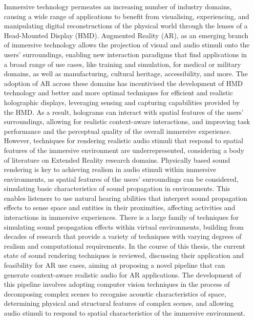 \beforeabstract{}
Immersive technology permeates an increasing number of industry domains, causing a wide range of applications to benefit from visualising, experiencing, and manipulating digital reconstructions of the physical world through the lenses of a Head-Mounted Display (HMD). Augmented Reality (AR), as an emerging branch of immersive technology allows the projection of visual and audio stimuli onto the users' surroundings, enabling new interaction paradigms that find applications in a broad range of use cases, like training and simulation, for medical or military domains, as well as manufacturing, cultural heritage, accessibility, and more.
The adoption of AR across these domains has incentivised the development of HMD technology and better and more optimal techniques for efficient and realistic holographic displays, leveraging sensing and capturing capabilities provided by the HMD. As a result, holograms can interact with spatial features of the users' surroundings, allowing for realistic context-aware interactions, and improving task performance and the perceptual quality of the overall immersive experience. However, techniques for rendering realistic audio stimuli that respond to spatial features of the immersive environment are underrepresented, considering a body of literature on Extended Reality research domains. 
Physically based sound rendering is key to achieving realism in audio stimuli within immersive environments, as spatial features of the users' surroundings can be considered, simulating basic characteristics of sound propagation in environments. This enables listeners to use natural hearing abilities that interpret sound propagation effects to sense space and entities in their proximities, affecting activities and interactions in immersive experiences. There is a large family of techniques for simulating sound propagation effects within virtual environments, building from decades of research that provide a variety of techniques with varying degrees of realism and computational requirements.
In the course of this thesis, the current state of sound rendering techniques is reviewed, discussing their application and feasibility for AR use cases, aiming at proposing a novel pipeline that can generate context-aware realistic audio for AR applications. The development of this pipeline involves adopting computer vision techniques in the process of decomposing complex scenes to recognise acoustic characteristics of space, determining physical and structural features of complex scenes, and allowing audio stimuli to respond to spatial characteristics of the immersive environment.
